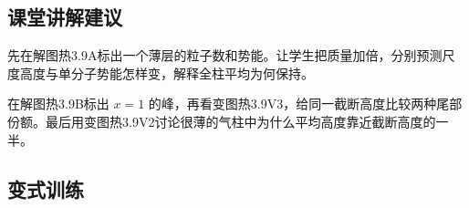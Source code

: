 \documentclass[UTF8,fontset=fandol,a4paper,11pt]{ctexart}
\begin{document}
\subsection*{课堂讲解建议}

先在解图热3.9A标出一个薄层的粒子数和势能。让学生把质量加倍，分别预测尺度高度与单分子势能怎样变，解释全柱平均为何保持。

在解图热3.9B标出 $x=1$ 的峰，再看变图热3.9V3，给同一截断高度比较两种尾部份额。最后用变图热3.9V2讨论很薄的气柱中为什么平均高度靠近截断高度的一半。



\subsection*{变式训练}
\end{document}
